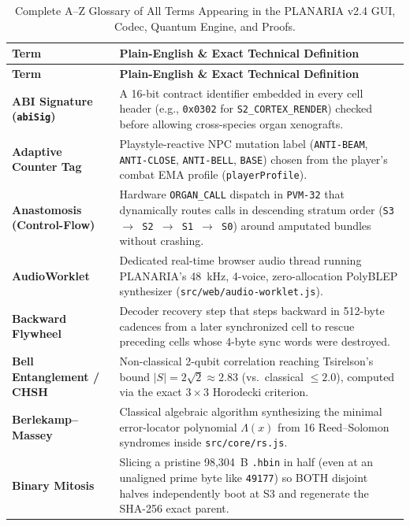 \documentclass[10pt,letterpaper]{article}
\begin{document}
{\footnotesize
\begin{longtable}{@{} L{3.9cm} L{13.1cm} @{}}
\caption[Complete A--Z Technical Glossary (51 Terms)]{Complete A--Z Glossary of All Terms Appearing in the PLANARIA v2.4 GUI, Codec, Quantum Engine, and Proofs.}
\label{tab:glossary} \\
\toprule
\textbf{Term} & \textbf{Plain-English \& Exact Technical Definition} \\
\midrule
\endfirsthead
\toprule
\textbf{Term} & \textbf{Plain-English \& Exact Technical Definition} \\
\midrule
\endhead
\textbf{ABI Signature (\texttt{abiSig})} & A 16-bit contract identifier embedded in every cell header (e.g., \texttt{0x0302} for \texttt{S2\_CORTEX\_RENDER}) checked before allowing cross-species organ xenografts. \\
\textbf{Adaptive Counter Tag} & Playstyle-reactive NPC mutation label (\texttt{ANTI-BEAM}, \texttt{ANTI-CLOSE}, \texttt{ANTI-BELL}, \texttt{BASE}) chosen from the player's combat EMA profile (\texttt{playerProfile}). \\
\textbf{Anastomosis (Control-Flow)} & Hardware \texttt{ORGAN\_CALL} dispatch in \texttt{PVM-32} that dynamically routes calls in descending stratum order (\texttt{S3 $\to$ S2 $\to$ S1 $\to$ S0}) around amputated bundles without crashing. \\
\textbf{AudioWorklet} & Dedicated real-time browser audio thread running PLANARIA's 48~kHz, 4-voice, zero-allocation PolyBLEP synthesizer (\texttt{src/web/audio-worklet.js}). \\
\textbf{Backward Flywheel} & Decoder recovery step that steps backward in 512-byte cadences from a later synchronized cell to rescue preceding cells whose 4-byte sync words were destroyed. \\
\textbf{Bell Entanglement / CHSH} & Non-classical 2-qubit correlation reaching Tsirelson's bound $|S| = 2\sqrt{2}\approx 2.83$ (vs.\ classical $\le 2.0$), computed via the exact $3\times 3$ Horodecki criterion. \\
\textbf{Berlekamp--Massey} & Classical algebraic algorithm synthesizing the minimal error-locator polynomial $\Lambda(x)$ from 16 Reed--Solomon syndromes inside \texttt{src/core/rs.js}. \\
\textbf{Binary Mitosis} & Slicing a pristine 98,304~B \texttt{.hbin} in half (even at an unaligned prime byte like \texttt{49177}) so BOTH disjoint halves independently boot at S3 and regenerate the SHA-256 exact parent. \\

\end{longtable}}
\end{document}
